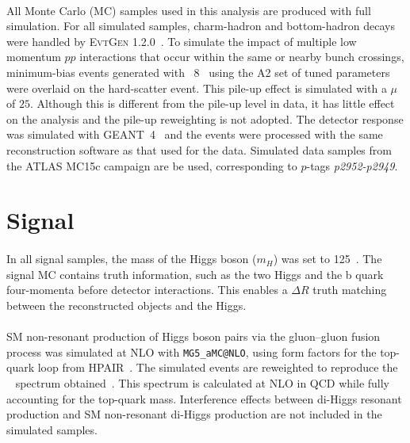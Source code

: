 \paragraph{}
All Monte Carlo (MC) samples used in this analysis are produced with full simulation.
For all simulated samples, charm-hadron and bottom-hadron decays were handled by {\textsc{EvtGen}} 1.2.0~\cite{EvtGen}. 
To simulate the impact of multiple low momentum $pp$ interactions that occur within the same or nearby bunch crossings, minimum-bias events generated with \pythia~8~\cite{Sjostrand:2006za} using the A2 set of tuned parameters~\cite{MC12AU2} were overlaid on the hard-scatter event.
This pile-up effect is simulated with a $\mu$ of $25$.
Although this is different from the pile-up level in data, it has little effect on the analysis and the pile-up reweighting is not adopted.
The detector response was simulated with GEANT~4~\cite{Agostinelli:2002hh, Aad:2010ah} and the events were processed with the same reconstruction software as that used for the data.  
Simulated data samples from the ATLAS MC15c campaign are be used, corresponding to $p$-tags \textit{p2952-p2949}.

\section{Signal}
\paragraph{}
In all signal samples, the mass of the Higgs boson ($m_H$) was set to 125~\GeV. 
The signal MC contains truth information, such as the two Higgs and the b quark four-momenta before detector interactions. 
This enables a $\Delta R$ truth matching between the reconstructed objects and the Higgs.

\paragraph{}
SM non-resonant production of Higgs boson pairs via the gluon--gluon fusion process was simulated at NLO with \texttt{MG5\_aMC@NLO}, using form factors for the top-quark loop from HPAIR~\cite{PhysRevD.58.115012, Plehn199646}. 
The simulated events are reweighted to reproduce the \mhh~ spectrum obtained~\cite{Borowka:2016ehy, Borowka:2016ypz}. 
This spectrum is calculated at NLO in QCD while fully accounting for the top-quark mass. 
Interference effects between di-Higgs resonant production and SM non-resonant di-Higgs production are not included in the simulated samples. 

